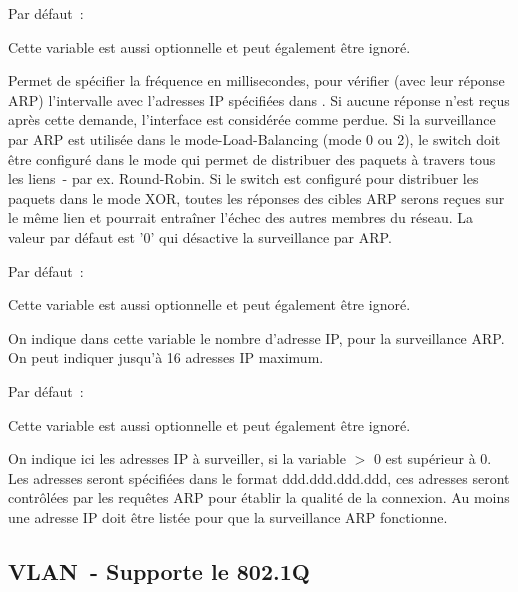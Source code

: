 \begin{description}

  Par défaut~: 

  Cette variable est aussi optionnelle et peut également être ignoré.

  Permet de spécifier la fréquence en millisecondes, pour vérifier (avec leur
  réponse ARP) l'intervalle avec l'adresses IP spécifiées dans
  . Si aucune réponse n'est reçus après
  cette demande, l'interface est considérée comme perdue. Si la surveillance par
  ARP est utilisée dans le mode-Load-Balancing (mode 0 ou 2), le switch doit être
  configuré dans le mode qui permet de distribuer des paquets à travers tous les
  liens~- par ex. Round-Robin. Si le switch est configuré pour distribuer les
  paquets dans le mode XOR, toutes les réponses des cibles ARP serons reçues sur
  le même lien et pourrait entraîner l'échec des autres membres du réseau. La
  valeur par défaut est '0' qui désactive la surveillance par ARP.


  Par défaut~: 

  Cette variable est aussi optionnelle et peut également être ignoré.

  On indique dans cette variable le nombre d'adresse IP, pour la surveillance ARP.
  On peut indiquer jusqu'à 16 adresses IP maximum.


  Par défaut~: 

  Cette variable est aussi optionnelle et peut également être ignoré.

  On indique ici les adresses IP à surveiller, si la variable
   $>$ 0 est supérieur à 0. Les adresses seront
  spécifiées dans le format ddd.ddd.ddd.ddd, ces adresses seront contrôlées par
  les requêtes ARP pour établir la qualité de la connexion. Au moins une adresse
  IP doit être listée pour que la surveillance ARP fonctionne.

\end{description}

{
\subsection {VLAN~- Supporte le 802.1Q}
}

